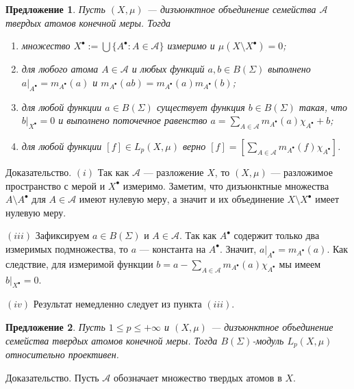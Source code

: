 \documentclass[12pt]{article}
\numberwithin{equation}{subsection}
\theoremstyle{plain}
\newtheorem{proposition}{Предложение}
\newenvironment{proof}{Доказательство.}{}
\begin{document}
\begin{fulltext}
    \begin{proposition}\label{HardAtomicMeasProp} Пусть $(X,\mu)$ ---
        дизъюнктное объединение семейства $\mathcal{A}$ твердых атомов конечной
        меры. Тогда

        \begin{enumerate}[label = (\roman*)]
            \item множество $X^\bullet:=\bigcup \{A^\bullet:A\in\mathcal{A}\}$
                  измеримо и $\mu(X\setminus X^\bullet)=0$;

            \item для любого атома $A\in\mathcal{A}$ и любых функций $a,b\in
                      B(\Sigma)$ выполнено $a|_{A^\bullet}=m_{A^\bullet}(a)$ и
                  $m_{A^\bullet}(ab)=m_{A^\bullet}(a)m_{A^\bullet}(b)$;

            \item для любой функции $a\in B(\Sigma)$ существует функция $b\in
                      B(\Sigma)$ такая, что $b|_{X^\bullet}=0$ и выполнено
                  поточечное равенство $a=\sum_{A\in\mathcal{A}}
                      m_{A^\bullet}(a)\chi_{A^\bullet} + b$;

            \item для любой функции $[f]\in L_p(X,\mu)$ верно
                  $[f]=[\sum_{A\in\mathcal{A}}
                      m_{A^\bullet}(f)\chi_{A^\bullet}]$.
        \end{enumerate}
    \end{proposition}
    \begin{proof} $(i)$ Так как $\mathcal{A}$ --- разложение $X$, то $(X,\mu)$
        --- разложимое пространство с мерой и $X^\bullet$ измеримо. Заметим, что
        дизъюнктные множества $A\setminus A^\bullet$ для $A\in\mathcal{A}$ имеют
        нулевую меру, а значит и их объединение $X\setminus X^\bullet$ имеет
        нулевую меру.

        $(iii)$ Зафиксируем $a\in B(\Sigma)$ и $A\in \mathcal{A}$. Так как
        $A^\bullet$ содержит только два измеримых подмножества, то $a$ ---
        константа на $A^\bullet$. Значит, $a|_{A^\bullet}=m_{A^\bullet}(a)$. Как
        следствие, для измеримой функции
        $b=a-\sum_{A\in\mathcal{A}}m_{A^\bullet}(a)\chi_{A^\bullet}$ мы имеем
        $b|_{X^\bullet}=0$.

        $(iv)$ Результат немедленно следует из пункта $(iii)$.
    \end{proof}

    \begin{proposition}\label{LpBSigmaModSuffCond} Пусть $1\leq p\leq +\infty$ и
        $(X,\mu)$ --- дизъюнктное объединение семейства твердых атомов конечной
        меры. Тогда $B(\Sigma)$-модуль $L_p(X,\mu)$ относительно проективен.
    \end{proposition}
    \begin{proof} Пусть $\mathcal{A}$ обозначает множество твердых атомов в $X$.


\end{proof}
\end{fulltext}
\end{document}
